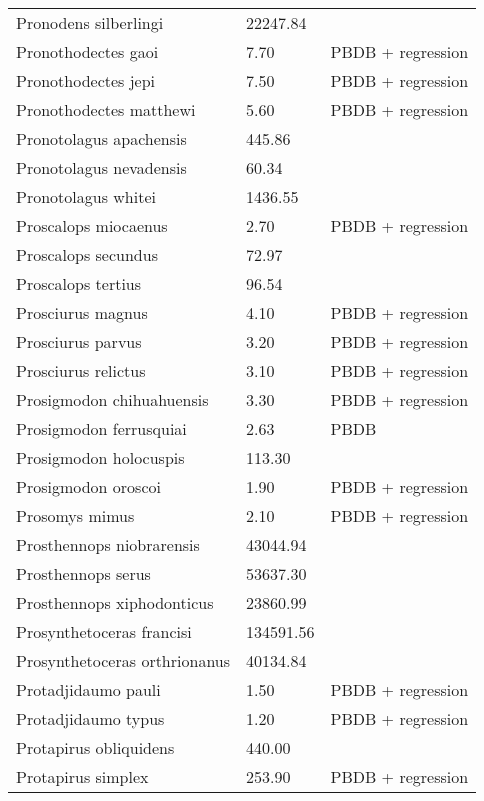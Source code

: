 \documentclass{article}
\begin{document}
\begin{center}
\begin{longtable}{p{} p{} p{}}
    Pronodens silberlingi & 22247.84 & \cite{Tomiya2013} \\ 
    Pronothodectes gaoi & 7.70 & PBDB + regression \\ 
    Pronothodectes jepi & 7.50 & PBDB + regression \\ 
    Pronothodectes matthewi & 5.60 & PBDB + regression \\ 
    Pronotolagus apachensis & 445.86 & \cite{Tomiya2013} \\ 
    Pronotolagus nevadensis & 60.34 & \cite{Tomiya2013} \\ 
    Pronotolagus whitei & 1436.55 & \cite{Tomiya2013} \\ 
    Proscalops miocaenus & 2.70 & PBDB + regression \\ 
    Proscalops secundus & 72.97 & \cite{Tomiya2013} \\ 
    Proscalops tertius & 96.54 & \cite{Tomiya2013} \\ 
    Prosciurus magnus & 4.10 & PBDB + regression \\ 
    Prosciurus parvus & 3.20 & PBDB + regression \\ 
    Prosciurus relictus & 3.10 & PBDB + regression \\ 
    Prosigmodon chihuahuensis & 3.30 & PBDB + regression \\ 
    Prosigmodon ferrusquiai & 2.63 & PBDB \\ 
    Prosigmodon holocuspis & 113.30 & \cite{Tomiya2013} \\ 
    Prosigmodon oroscoi & 1.90 & PBDB + regression \\ 
    Prosomys mimus & 2.10 & PBDB + regression \\ 
    Prosthennops niobrarensis & 43044.94 & \cite{Tomiya2013} \\ 
    Prosthennops serus & 53637.30 & \cite{Tomiya2013} \\ 
    Prosthennops xiphodonticus & 23860.99 & \cite{Tomiya2013} \\ 
    Prosynthetoceras francisi & 134591.56 & \cite{Tomiya2013} \\ 
    Prosynthetoceras orthrionanus & 40134.84 & \cite{Tomiya2013} \\ 
    Protadjidaumo pauli & 1.50 & PBDB + regression \\ 
    Protadjidaumo typus & 1.20 & PBDB + regression \\ 
    Protapirus obliquidens & 440.00 & \cite{Rose1982a} \\ 
    Protapirus simplex & 253.90 & PBDB + regression \\ 

\end{longtable}
\end{center}
\end{document}

